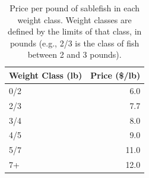 \documentclass[11pt]{book}
\begin{document}
\begingroup\fontsize{12}{14}\selectfont
\begin{longtable}[t]{lr}
\caption{\label{tab:unnamed-chunk-7}Price per pound of sablefish in each weight class. Weight classes are defined by the limits of that class, in pounds (e.g., 2/3 is the class of fish between 2 and 3 pounds).}\\
\toprule
\textbf{Weight Class (lb)} & \textbf{Price (\$/lb)}\\
\midrule
0/2 & 6.0\\
2/3 & 7.7\\
3/4 & 8.0\\
4/5 & 9.0\\
5/7 & 11.0\\
7+ & 12.0\\
\bottomrule
\end{longtable}
\endgroup{}

\newpage
\end{document}
